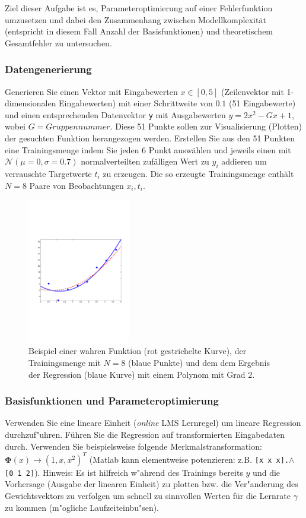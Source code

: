 \documentclass[a4]{article}
\begin{document}
Ziel dieser Aufgabe ist es, Parameteroptimierung auf einer Fehlerfunktion umzusetzen und dabei den Zusammenhang zwischen Modellkomplexität (entspricht in diesem Fall Anzahl der Basisfunktionen) und theoretischem Gesamtfehler zu untersuchen.

\subsubsection{Datengenerierung}
Generieren Sie einen Vektor mit Eingabewerten $x \in [0,5]$ (Zeilenvektor mit 1-dimensionalen Eingabewerten) mit einer Schrittweite von $0.1$ (51 Eingabewerte)
und einen entsprechenden Datenvektor \texttt{y} mit Ausgabewerten $y = 2x^2-Gx+1$, wobei
$G=Gruppennummer$. Diese 51 Punkte sollen zur Visualisierung (Plotten) der gesuchten Funktion herangezogen werden.
Erstellen Sie aus den 51 Punkten eine Trainingsmenge indem Sie jeden 6 Punkt auswählen und
jeweils einen mit $\mathcal{N}(\mu = 0,\sigma = 0.7)$ normalverteilten zufälligen Wert zu $y_i$ addieren um verrauschte Targetwerte $t_i$ zu erzeugen. Die so erzeugte Trainingsmenge enthält $N = 8$ Paare von Beobachtungen $x_i, t_i$. 

\begin{figure}[!h]
\begin{center}
\includegraphics[width=4.5cm]{regression.pdf}
\end{center}
\caption{Beispiel einer wahren Funktion (rot gestrichelte Kurve), der Trainingsmenge mit $N=8$ (blaue Punkte) und dem
dem Ergebnis der Regression (blaue Kurve) mit einem Polynom mit Grad 2.}
\end{figure}

\subsubsection{Basisfunktionen und Parameteroptimierung}

Verwenden Sie eine lineare Einheit (\emph{online} LMS Lernregel) um lineare Regression durchzuf"uhren. Führen Sie die Regression auf transformierten Eingabedaten durch. Verwenden Sie beispielsweise folgende Merkmalstransformation: ${\mathbf \Phi}(x) \rightarrow (1,x,x^2)^T$ (Matlab kann elementweise potenzieren: z.B. \texttt{[x x x].$\wedge$ [0 1 2]}). Hinweis:  Es ist hilfreich w"ahrend des Trainings bereits $y$ und die Vorhersage (Ausgabe der linearen Einheit) zu plotten bzw. die Ver"anderung des Gewichtsvektors zu verfolgen um schnell zu sinnvollen Werten für die Lernrate $\gamma$ zu kommen (m"ogliche Laufzeiteinbu"sen). 
\end{document}

